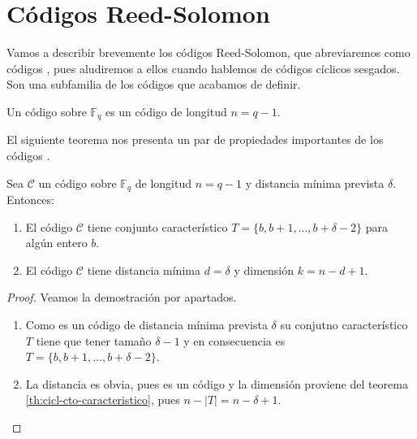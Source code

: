 \section{Códigos Reed-Solomon}

Vamos a describir brevemente los códigos Reed-Solomon, que abreviaremos como códigos , pues aludiremos a ellos cuando hablemos de códigos cíclicos sesgados.
Son una subfamilia de los códigos  que acabamos de definir.

\begin{definition}
  Un código  sobre \(\mathbb F_q\) es un código  de longitud \(n = q - 1\).
\end{definition}

El siguiente teorema nos presenta un par de propiedades importantes de los códigos .

\begin{theorem}
  Sea \(\mathcal C\) un código  sobre \(\mathbb F_q\) de longitud \(n = q - 1\) y distancia mínima prevista \(\delta\).
  Entonces:
  \begin{enumerate}
    \item El código \(\mathcal C\) tiene conjunto característico \(T = \{b, b + 1, \dots, b + \delta - 2\}\) para algún entero \(b\).
    \item El código \(\mathcal C\) tiene distancia mínima \(d = \delta\) y dimensión \(k = n - d + 1\).
  \end{enumerate}
\end{theorem}

\begin{proof}
  Veamos la demostración por apartados.
  \begin{enumerate}
    \item Como es un código  de distancia mínima prevista \(\delta\) su conjutno característico \(T\) tiene que tener tamaño \(\delta - 1\) y en consecuencia es \(T = \{b, b + 1, \dots, b + \delta - 2\}\).
    \item La distancia es obvia, pues es un código  y la dimensión proviene del teorema \ref{th:cicl-cto-caracteristico}, pues \(n - |T| = n - \delta + 1\).
  \end{enumerate}
\end{proof}


